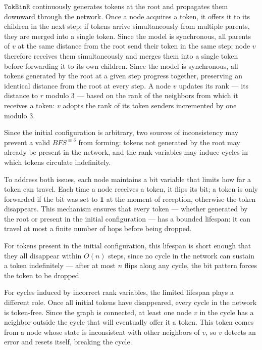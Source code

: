 \documentclass[a4paper, 12pt]{article}
\newcommand{\bo}{\mathbf{1}}
\begin{document}
$\mathtt{TokBinR}$ continuously generates tokens at the root and 
propagates them downward through the network. Once a node acquires a 
token, it offers it to its children in the next step; if tokens arrive 
simultaneously from multiple parents, they are merged into a single 
token. Since the model is synchronous, all parents of $v$ at the same 
distance from the root send their token in the same step; node $v$ 
therefore receives them simultaneously and merges them into a single 
token before forwarding it to its own children. Since the model is synchronous, all tokens generated by 
the root at a given step progress together, preserving an identical 
distance from the root at every step. A node $v$ updates its rank — 
its distance to $r$ modulo $3$ — based on the rank of the neighbors 
from which it receives a token: $v$ adopts the rank of its token 
senders incremented by one modulo $3$.

Since the initial configuration is arbitrary, two sources of 
inconsistency may prevent a valid $BFS^{\equiv 3}$ from forming: tokens 
not generated by the root may already be present in the network, and 
the rank variables may induce cycles in which tokens circulate 
indefinitely.

To address both issues, each node maintains a bit variable that limits 
how far a token can travel. Each time a node receives a token, it 
flips its bit; a token is only forwarded if the bit was set to $\bo$ 
at the moment of reception, otherwise the token disappears. This 
mechanism ensures that every token — whether generated by the root or 
present in the initial configuration — has a bounded lifespan: it can 
travel at most a finite number of hops before being dropped.

For tokens present in the initial configuration, this lifespan is 
short enough that they all disappear within $O(n)$ steps, since no 
cycle in the network can sustain a token indefinitely — after at most 
$n$ flips along any cycle, the bit pattern forces the token to be 
dropped.

For cycles induced by incorrect rank variables, the limited lifespan 
plays a different role. Once all initial tokens have disappeared, 
every cycle in the network is token-free. Since the graph is 
connected, at least one node $v$ in the cycle has a neighbor outside 
the cycle that will eventually offer it a token. This token comes from 
a node whose state is inconsistent with other neighbors of $v$, so $v$ 
detects an error and resets itself, breaking the cycle.
\end{document}
